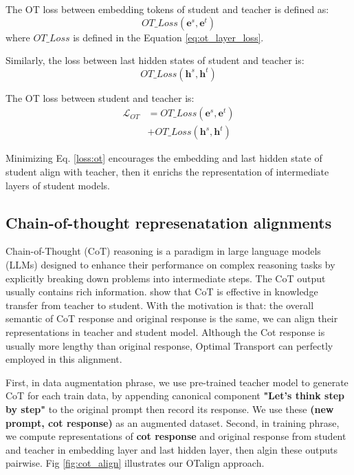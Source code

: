 The OT loss between embedding tokens of student and teacher is defined as:
\begin{equation}
    OT\_Loss(\mathbf{e}^s,\mathbf{e}^t)
    \label{ot:emb}
\end{equation}
where $OT\_Loss$ is defined in the Equation \ref{eq:ot_layer_loss}.

Similarly, the loss between last hidden states of student and teacher is:
\begin{equation}
    OT\_Loss(\mathbf{h}^s,\mathbf{h}^t)
    \label{ot:hidden}
\end{equation}

The OT loss between student and teacher is:
\begin{equation}
\begin{aligned}
\mathcal{L}_{OT} & = OT\_Loss(\mathbf{e}^s,\mathbf{e}^t) \\
                &+ OT\_Loss(\mathbf{h}^s,\mathbf{h}^t)    
\end{aligned}
\label{loss:ot}
\end{equation}

Minimizing Eq. \ref{loss:ot} encourages the embedding and last hidden state of student align with teacher, then it enrichs the representation of intermediate layers of student models.

\subsection{Chain-of-thought represenatation alignments}
Chain-of-Thought (CoT) \cite{wei2022chain} reasoning is a paradigm in large language models (LLMs) designed to enhance their performance on complex reasoning tasks by explicitly breaking down problems into intermediate steps. The CoT output usually contains rich information. \cite{ranaldi2024aligning} show that CoT is effective in knowledge transfer from teacher to student. With the motivation is that: the overall semantic of CoT response and original response is the same, we can align their representations in teacher and student model. Although the Cot response is usually more lengthy than original response, Optimal Transport can perfectly employed in this alignment. 

First, in data augmentation phrase, we use pre-trained teacher model to generate CoT for each train data, by appending canonical component \textbf{"Let’s think step by step"} to the original prompt then record its response. We use these \textbf{(new prompt, cot response)} as an augmented dataset. Second, in training phrase, we compute representations of \textbf{cot response} and original response from student and teacher in embedding layer and last hidden layer, then algin these outputs pairwise. Fig \ref{fig:cot_align} illustrates our OTalign approach.

